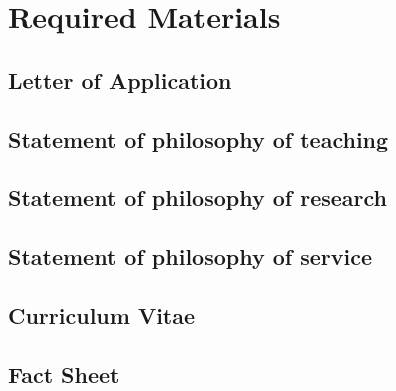 \documentclass[ openright,titlepage,numbers=noenddot,headinclude,%
                footinclude=true,cleardoublepage=empty,abstractoff, 
                BCOR=5mm,paper=letter,fontsize=11pt,%
                ngerman, american, %
                ]{scrreprt}
\begin{document}
\frenchspacing
\raggedbottom
{} %
\pagestyle{plain}

\pagestyle{scrheadings}
\cleardoublepage
\cleardoublepage
\part{Required Materials}
%

\chapter{Letter of Application}
%

\chapter{Statement of philosophy of teaching}
%
\chapter{Statement of philosophy of research}
%
\chapter{Statement of philosophy of service}
%
\chapter{Curriculum Vitae}


\chapter{Fact Sheet}
%
\end{document}
